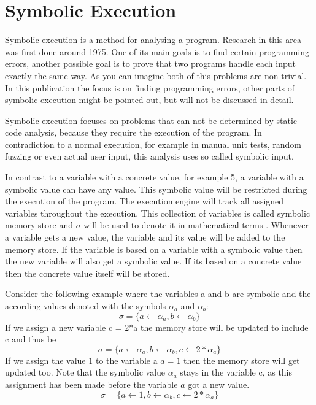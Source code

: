 \section{Symbolic Execution}\label{section:symbolic_execution}
Symbolic execution is a method for analysing a program. Research in this area was first done around 1975. One of its main goals is to find certain programming errors, another possible goal is to prove that two programs handle each input exactly the same way. As you can imagine both of this problems are non trivial. In this publication the focus is on finding programming errors, other parts of symbolic execution might be pointed out, but will not be discussed in detail. 

Symbolic execution focuses on problems that can not be determined by static code analysis, because they require the execution of the program. In contradiction to a normal execution, for example in manual unit tests, random fuzzing or even actual user input, this analysis uses so called symbolic input.

In contrast to a variable with a concrete value, for example 5, a variable with a symbolic value can have any value. This symbolic value will be restricted during the execution of the program. The execution engine will track all assigned variables throughout the execution. This collection of variables is called symbolic memory store and $\sigma$ will be used to denote it in mathematical terms \cite{SurveySymExec-CSUR18}.
Whenever a variable gets a new value, the variable and its value will be added to the memory store. If the variable is based on a variable with a symbolic value then the new variable will also get a symbolic value. If its based on a concrete value then the concrete value itself will be stored.

Consider the following example where the variables a and b are symbolic and the according values denoted with the symbols $\alpha_a$ and $\alpha_b$:
$$\sigma = \{a\gets \alpha_a , b \gets \alpha_b\}$$
If we assign a new variable c = 2*a the memory store will be updated to include c and thus be
$$\sigma = \{a\gets \alpha_a , b \gets \alpha_b, c \gets 2*\alpha_a\}$$
If we assign the value $1$ to the variable a $a = 1$ then the memory store will get updated too. Note that the symbolic value $\alpha_a$ stays in the variable c, as this assignment has been made before the variable $a$ got a new value.
$$\sigma = \{a\gets 1, b \gets \alpha_b, c \gets 2*\alpha_a\}$$


